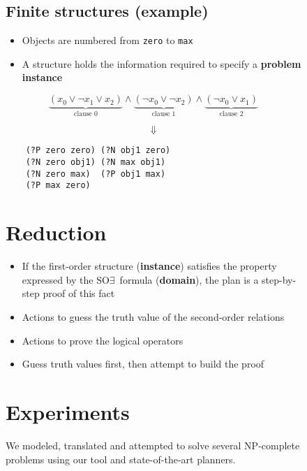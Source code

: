 \documentclass[portrait]{sciposter}
\newcommand{\SOE}{\ensuremath{\text{SO}\exists}}
\begin{document}
\begin{figure}[ht]
\begin{minipage}{0.666\linewidth}
\begin{multicols}{2}
\subsection*{Finite structures (example)}
\begin{large}
\begin{itemize}
    \item Objects are numbered from \texttt{zero} to \texttt{max}
    \item A structure holds the information required to specify a \textbf{problem instance}
\end{itemize}

\[\underbrace{(x_0\lor\neg x_1\lor x_2)}_{\text{clause 0}} \land
\underbrace{(\neg x_0 \lor \neg x_2)}_{\text{clause 1}} \land 
\underbrace{(\neg x_0 \lor x_1)}_{\text{clause 2}} \]
\begin{Large}{\[\Downarrow\]}\end{Large}
\begin{verbatim}
    (?P zero zero) (?N obj1 zero) 
    (?N zero obj1) (?N max obj1)
    (?N zero max)  (?P obj1 max)
    (?P max zero)
\end{verbatim}
\end{large}

\end{multicols}
\section*{\large{Reduction}}
\begin{large}
\begin{itemize}
    \item If the first-order structure (\textbf{instance}) satisfies the property 
          expressed by the \SOE\ formula (\textbf{domain}), the plan is a step-by-step
          proof of this fact
    \item Actions to guess the truth value of the second-order relations
    \item Actions to prove the logical operators
    \item Guess truth values first, then attempt to build the proof
\end{itemize}
\end{large}


\section*{\large{Experiments}}

We modeled, translated and attempted to solve several NP-complete problems using
our tool and state-of-the-art planners.
\begin{multicols}{2}

\end{multicols}
\end{minipage}
\end{figure}
\end{document}
